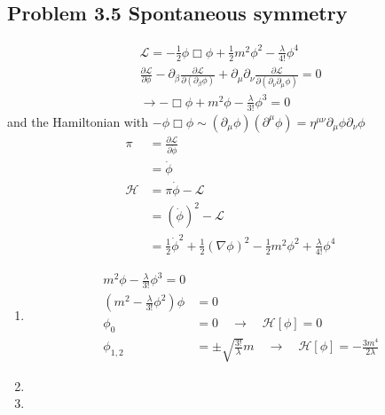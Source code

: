 \documentclass[../main.tex]{subfiles}
\begin{document}
\subsection{Problem 3.5 Spontaneous symmetry}
\begin{align}
\mathscr{L}=-\frac{1}{2}\phi\Box\phi+\frac{1}{2}m^2\phi^2-\frac{\lambda}{4!}\phi^4\\
    \frac{\partial\mathscr{L}}{\partial \phi}-\partial_\beta\frac{\partial\mathscr{L}}{\partial(\partial_\beta \phi)}+\partial_\mu\partial_\nu\frac{\partial \mathcal{L}}{\partial(\partial_\nu\partial_\mu\phi)}=0\\
    \rightarrow -\Box\phi+m^2\phi-\frac{\lambda}{3!}\phi^3=0
\end{align}
and the Hamiltonian with $-\phi\Box\phi\sim(\partial_\mu\phi)(\partial^\mu\phi)=\eta^{\mu\nu}\partial_\mu\phi\partial_\nu\phi$
\begin{align}
\pi
&=\frac{\partial\mathcal{L}}{\partial\dot\phi}\\
&=\dot\phi\\
\mathcal{H}
&=\pi\dot\phi-\mathcal{L}\\
&=(\dot\phi)^2-\mathcal{L}\\
&=\frac{1}{2}\dot\phi^2+\frac{1}{2}(\nabla\phi)^2-\frac{1}{2}m^2\phi^2+\frac{\lambda}{4!}\phi^4
\end{align}
\begin{enumerate}[label=(\alph*)]
\item 
\begin{align}
m^2\phi-\frac{\lambda}{3!}\phi^3=0\\
(m^2-\frac{\lambda}{3!}\phi^2)\phi&=0\\
\phi_0&=0\quad\rightarrow\quad\mathcal{H}[\phi]=0\\
\phi_{1,2}&=\pm\sqrt{\frac{3!}{\lambda}}m\quad\rightarrow\quad\mathcal{H}[\phi]=-\frac{3m^4}{2\lambda}
\end{align} 

\item
\item   
\end{enumerate}
\end{document}
